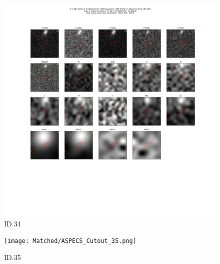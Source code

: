 \begin{figure}[tbp]
\centering \includegraphics[width=120mm]{Matched/ASPECS_Cutout_34.png}
\caption{ID.34}
\label{fig:Match_Three}
\end{figure}

\begin{figure}[tbp]
\centering \texttt{[image: Matched/ASPECS\_Cutout\_35.png]}
\caption{ID.35}
\label{fig:Match_Three}
\end{figure}
